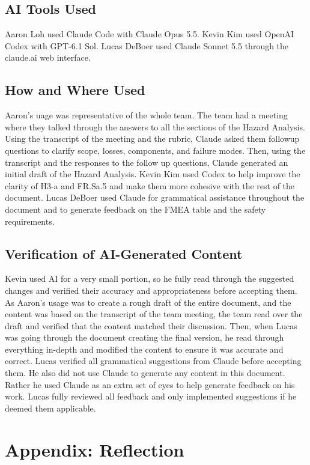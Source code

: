 \documentclass{article}
\begin{document}
\subsection{AI Tools Used}
Aaron Loh used Claude Code with Claude Opus 5.5.
Kevin Kim used OpenAI Codex with GPT-6.1 Sol.
Lucas DeBoer used Claude Sonnet 5.5 through the claude.ai web interface.

\subsection{How and Where Used}
Aaron's uage was representative of the whole team. The team had a meeting where they talked through the answers to all the sections of the Hazard Analysis. Using the transcript of the meeting and the rubric, Claude asked them followup questions to clarify scope, losses, components, and failure modes. Then, using the transcript and the responses to the follow up questions, Claude generated an initial draft of the Hazard Analysis.
Kevin Kim used Codex to help improve the clarity of H3-a and FR.Sa.5 and make them more cohesive with the rest of the document.
Lucas DeBoer used Claude for grammatical assistance throughout the document and to generate feedback on the FMEA table and the safety requirements.

\subsection{Verification of AI-Generated Content}
Kevin used AI for a very small portion, so he fully read through the suggested changes and verified their accuracy and appropriateness before accepting them.
As Aaron's usage was to create a rough draft of the entire document, and the content was based on the transcript of the team meeting, the team read over the draft and verified that the content matched their discussion. Then, when Lucas was going through the document creating the final version, he read through everything in-depth and modified the content to ensure it was accurate and correct.
Lucas verified all grammatical suggestions from Claude before accepting them. He also did not use Claude to generate any content in this document. Rather he used Claude as an extra set of eyes to help generate feedback on his work. Lucas fully reviewed all feedback and only implemented suggestions if he deemed them applicable. 

\newpage{}

\section{Appendix: Reflection}






\end{document}
